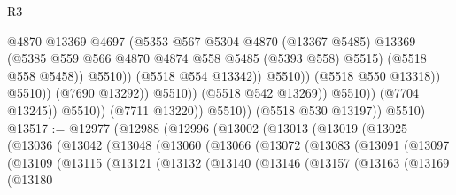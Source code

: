\begin{lexlean}{R3}
\begin{coremodule}
                                                @4870
                                                @13369
                                                @4697
                                                (@5353
                                                  @567
                                                  @5304
                                                  @4870
                                                  (@13367 @5485)
                                                  @13369
                                                  (@5385
                                                    @559
                                                    @566
                                                    @4870
                                                    @4874
                                                    @558
                                                    @5485
                                                    (@5393 @558)
                                                    @5515)
                                                  (@5518 @558 @5458))
                                                @5510))
                                            (@5518 @554 @13342))
                                          @5510))
                                      (@5518 @550 @13318))
                                    @5510))
                                (@7690 @13292))
                              @5510))
                          (@5518 @542 @13269))
                        @5510))
                    (@7704 @13245))
                  @5510))
              (@7711 @13220))
            @5510))
        (@5518 @530 @13197))
      @5510)
@13517 := @12977
    (@12988
      (@12996
        (@13002
          (@13013
            (@13019
              (@13025
                (@13036
                  (@13042
                    (@13048
                      (@13060
                        (@13066
                          (@13072
                            (@13083
                              (@13091
                                (@13097
                                  (@13109
                                    (@13115
                                      (@13121
                                        (@13132
                                          (@13140
                                            (@13146
                                              (@13157
                                                (@13163
                                                  (@13169
                                                    (@13180

\end{coremodule}
\end{lexlean}
